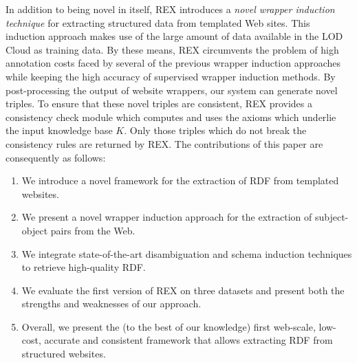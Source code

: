 In addition to being novel in itself, REX introduces a \emph{novel wrapper induction technique} for extracting structured data from templated Web sites. 
This induction approach makes use of the large amount of data available in the LOD Cloud as training data. 
By these means, REX circumvents the problem of high annotation costs faced by several of the previous wrapper induction approaches~\cite{Hogue:2005:TAU:1060745.1060762,flesca2004web} while keeping the high accuracy of supervised wrapper induction methods. 
By post-processing the output of website wrappers, our system can generate novel triples. 
To ensure that these novel triples are consistent, REX provides a consistency check module which computes and uses the axioms which underlie the input knowledge base $K$. 
Only those triples which do not break the consistency rules are returned by REX. 
The contributions of this paper are consequently as follows:
\begin{enumerate}
\item We introduce a novel framework for the extraction of RDF from templated websites.
\item We present a novel wrapper induction approach for the extraction of subject-object pairs from the Web.
\item We integrate state-of-the-art disambiguation and schema induction techniques to retrieve high-quality RDF. 
\item We evaluate the first version of REX on three datasets and present both the strengths and weaknesses of our approach.
\item Overall, we present the (to the best of our knowledge) first web-scale, low-cost, accurate and consistent framework that allows extracting RDF from structured websites.
\end{enumerate}

